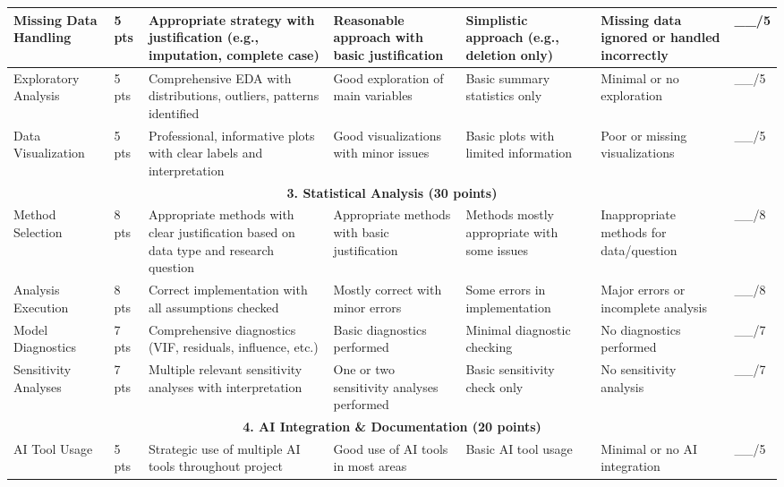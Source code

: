 \documentclass[11pt,landscape]{article}
\begin{document}
\begin{longtable}{|p{3.5cm}|p{1.5cm}|p{4cm}|p{4cm}|p{4cm}|p{4cm}|p{1.5cm}|}
Missing Data Handling & 5 pts &
Appropriate strategy with justification (e.g., imputation, complete case) &
Reasonable approach with basic justification &
Simplistic approach (e.g., deletion only) &
Missing data ignored or handled incorrectly &
\_\_/5 \\
\hline

Exploratory Analysis & 5 pts &
Comprehensive EDA with distributions, outliers, patterns identified &
Good exploration of main variables &
Basic summary statistics only &
Minimal or no exploration &
\_\_/5 \\
\hline

Data Visualization & 5 pts &
Professional, informative plots with clear labels and interpretation &
Good visualizations with minor issues &
Basic plots with limited information &
Poor or missing visualizations &
\_\_/5 \\
\hline

\multicolumn{7}{|c|}{\textbf{3. Statistical Analysis (30 points)}} \\
\hline

Method Selection & 8 pts &
Appropriate methods with clear justification based on data type and research question &
Appropriate methods with basic justification &
Methods mostly appropriate with some issues &
Inappropriate methods for data/question &
\_\_/8 \\
\hline

Analysis Execution & 8 pts &
Correct implementation with all assumptions checked &
Mostly correct with minor errors &
Some errors in implementation &
Major errors or incomplete analysis &
\_\_/8 \\
\hline

Model Diagnostics & 7 pts &
Comprehensive diagnostics (VIF, residuals, influence, etc.) &
Basic diagnostics performed &
Minimal diagnostic checking &
No diagnostics performed &
\_\_/7 \\
\hline

Sensitivity Analyses & 7 pts &
Multiple relevant sensitivity analyses with interpretation &
One or two sensitivity analyses performed &
Basic sensitivity check only &
No sensitivity analysis &
\_\_/7 \\
\hline

\multicolumn{7}{|c|}{\textbf{4. AI Integration \& Documentation (20 points)}} \\
\hline

AI Tool Usage & 5 pts &
Strategic use of multiple AI tools throughout project &
Good use of AI tools in most areas &
Basic AI tool usage &
Minimal or no AI integration &
\_\_/5 \\
\hline


\end{longtable}
\end{document}
